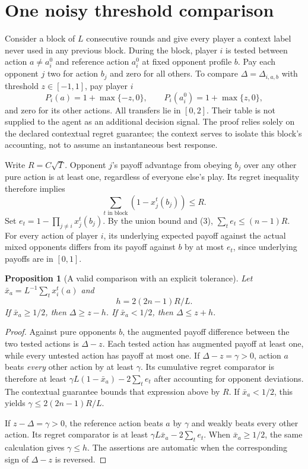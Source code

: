 \documentclass[11pt,a4paper]{article}
\newtheorem{proposition}[theorem]{Proposition}
\begin{document}
\section{One noisy threshold comparison}
Consider a block of $L$ consecutive rounds and give every player a context label never used in any previous block. During the block, player $i$ is tested between action $a\ne a_i^0$ and reference action $a_i^0$ at fixed opponent profile $b$. Pay each opponent $j$ two for action $b_j$ and zero for all others. To compare $\Delta=\Delta_{i,a,b}$ with threshold $z\in[-1,1]$, pay player $i$
\[
 P_i(a)=1+\max\{-z,0\},\qquad
 P_i(a_i^0)=1+\max\{z,0\},
\]
and zero for its other actions. All transfers lie in $[0,2]$. Their table is not supplied to the agent as an additional decision signal. The proof relies solely on the declared contextual regret guarantee; the context serves to isolate this block's accounting, not to assume an instantaneous best response.

Write $R=C\sqrt T$. Opponent $j$'s payoff advantage from obeying $b_j$ over any other pure action is at least one, regardless of everyone else's play. Its regret inequality therefore implies
\[
 \sum_{t\text{ in block}}(1-x_j^t(b_j))\le R.             \tag{3}
\]
Set $e_t=1-\prod_{j\ne i}x_j^t(b_j)$. By the union bound and (3),
$\sum_te_t\le(n-1)R$. For every action of player $i$, its underlying expected payoff against the actual mixed opponents differs from its payoff against $b$ by at most $e_t$, since underlying payoffs are in $[0,1]$.

\begin{proposition}[A valid comparison with an explicit tolerance]
Let $\bar x_a=L^{-1}\sum_t x_i^t(a)$ and
\[
 h=2(2n-1)R/L.                                          \tag{4}
\]
If $\bar x_a\ge1/2$, then $\Delta\ge z-h$. If $\bar x_a<1/2$, then $\Delta\le z+h$.
\end{proposition}
\begin{proof}
Against pure opponents $b$, the augmented payoff difference between the two tested actions is $\Delta-z$. Each tested action has augmented payoff at least one, while every untested action has payoff at most one. If $\Delta-z=\gamma>0$, action $a$ beats \emph{every} other action by at least $\gamma$. Its cumulative regret comparator is therefore at least
$\gamma L(1-\bar x_a)-2\sum_te_t$ after accounting for opponent deviations. The contextual guarantee bounds that expression above by $R$. If $\bar x_a<1/2$, this yields $\gamma\le2(2n-1)R/L$.

If $z-\Delta=\gamma>0$, the reference action beats $a$ by $\gamma$ and weakly beats every other action. Its regret comparator is at least
$\gamma L\bar x_a-2\sum_te_t$. When $\bar x_a\ge1/2$, the same calculation gives $\gamma\le h$. The assertions are automatic when the corresponding sign of $\Delta-z$ is reversed.
\end{proof}
\end{document}
